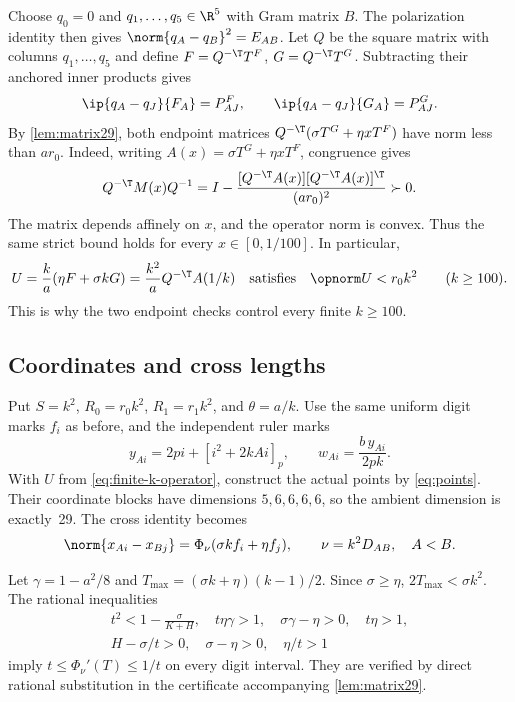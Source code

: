 Choose $q_0=0$ and $q_1,\ldots,q_5\in\R^5$ with Gram matrix $B$. The
polarization identity then gives $\norm{q_A-q_B}^2=E_{AB}$. Let $Q$ be the
square matrix with columns $q_1,\ldots,q_5$ and define
$F=Q^{-\T}T^F$, $G=Q^{-\T}T^G$. Subtracting their anchored inner products
gives
\[
 \ip{q_A-q_J}{F_A}=P^F_{AJ},\qquad
 \ip{q_A-q_J}{G_A}=P^G_{AJ}.
\]
By \cref{lem:matrix29}, both endpoint matrices
$Q^{-\T}(\sigma T^G+\eta xT^F)$ have norm less than $ar_0$.
Indeed, writing $A(x)=\sigma T^G+\eta xT^F$, congruence gives
\[
 Q^{-\T}M(x)Q^{-1}
 =I-\frac{[Q^{-\T}A(x)][Q^{-\T}A(x)]^\T}{(ar_0)^2}\succ0.
\]
The matrix depends affinely on $x$, and the operator norm is convex.
Thus the same strict bound holds for every $x\in[0,1/100]$. In particular,
\begin{equation}\label{eq:finite-k-operator}
 U=\frac{k}{a}(\eta F+\sigma kG)
   =\frac{k^2}{a}Q^{-\T}A(1/k)
 \quad\text{satisfies}\quad \opnorm U<r_0k^2
 \qquad(k\ge100).
\end{equation}
This is why the two endpoint checks control every finite $k\ge100$.

\subsection{Coordinates and cross lengths}

Put $S=k^2$, $R_0=r_0k^2$, $R_1=r_1k^2$, and $\theta=a/k$. Use the same
uniform digit marks $f_i$ as before, and the independent ruler marks
\begin{equation}\label{eq:ruler29}
 y_{Ai}=2pi+[i^2+2kAi]_p,\qquad w_{Ai}=\frac{b\,y_{Ai}}{2pk}.
\end{equation}
With $U$ from \eqref{eq:finite-k-operator}, construct the actual points by
\eqref{eq:points}. Their coordinate blocks have dimensions $5,6,6,6,6$,
so the ambient dimension is exactly~29. The cross identity becomes
\begin{equation}\label{eq:r29-cross}
 \norm{x_{Ai}-x_{Bj}}=\Phi_\nu(\sigma kf_i+\eta f_j),
 \qquad\nu=k^2D_{AB},\quad A<B.
\end{equation}

Let $\gamma=1-a^2/8$ and $T_{\max}=(\sigma k+\eta)(k-1)/2$.
Since $\sigma\ge\eta$, $2T_{\max}<\sigma k^2$. The rational inequalities
\begin{equation}\label{eq:r29-cross-guards}
\begin{gathered}
 t^2<1-\frac{\sigma}{K+H},\quad t\eta\gamma>1,\quad
 \sigma\gamma-\eta>0,\quad t\eta>1,\\
 H-\sigma/t>0,\quad\sigma-\eta>0,\quad\eta/t>1
\end{gathered}
\end{equation}
imply $t\le\Phi_\nu'(T)\le1/t$ on every digit interval. They are verified
by direct rational substitution in the certificate accompanying
\cref{lem:matrix29}.

